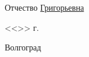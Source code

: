 \documentclass[a4paper, 14pt]{extreport}
\begin{document}
\begin{titlepage}
\begin{flushleft}
            Отчество \underline{Григорьевна\hspace{2.8cm}}
        \end{flushleft}
        \vspace{1.5cm}
        \begin{flushright}
            <<\underline{\hspace{1.0cm}}>>\underline{\hspace{4.0cm}} \the\year г.
        \end{flushright}
        \vspace{\fill}
        \begin{center}
            Волгоград \the\year
        \end{center}
    \end{titlepage}
    \tableofcontents
    \newpage
    \onehalfspacing
    
\end{document}
